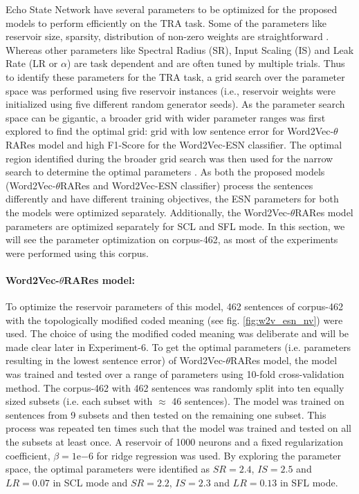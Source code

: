 Echo State Network have several parameters to be optimized for the proposed models to perform efficiently on the TRA task. Some of the parameters like reservoir size, sparsity, distribution of non-zero weights are straightforward \cite{esn:practical_guide}. Whereas other parameters like Spectral Radius (SR), Input Scaling (IS) and Leak Rate (LR or $\alpha$) are task dependent and are often tuned by multiple trials. Thus to identify these parameters for the TRA task, a grid search over the parameter space was performed using five reservoir instances (i.e., reservoir weights were initialized using five different random generator seeds). As the parameter search space can be gigantic, a broader grid with wider parameter ranges was first explored to find the optimal grid: grid with low sentence error for Word2Vec-$\theta$RARes model and high F1-Score for the Word2Vec-ESN classifier. The optimal region identified during the broader grid search was then used for the narrow search to determine the optimal parameters \cite{esn:practical_guide}. As both the proposed models (Word2Vec-$\theta$RARes and Word2Vec-ESN classifier) process the sentences differently and have different training objectives, the ESN parameters for both the models were optimized separately. Additionally, the Word2Vec-$\theta$RARes model parameters are optimized separately for SCL and SFL mode. In this section, we will see the parameter optimization on corpus-462, as most of the experiments were performed using this corpus. 

\paragraph{Word2Vec-$\theta$RARes model:} To optimize the reservoir parameters of this model, 462 sentences of corpus-462 with the topologically modified coded meaning (see fig. \ref{fig:w2v_esn_nv}) were used. The choice of using the modified coded meaning was deliberate and will be made clear later in Experiment-6. To get the optimal parameters (i.e. parameters resulting in the lowest sentence error) of Word2Vec-$\theta$RARes model, the model was trained and tested over a range of parameters using 10-fold cross-validation method. The corpus-462 with 462 sentences was randomly split into ten equally sized subsets (i.e. each subset with $\approx$ 46 sentences). The model was trained on sentences from 9 subsets and then tested on the remaining one subset. This process was repeated ten times such that the model was trained and tested on all the subsets at least once. A reservoir of 1000 neurons and a fixed regularization coefficient, $\beta = 1\mathrm{e}{-6}$ for ridge regression was used. By exploring the parameter space, the optimal parameters were identified as $SR = 2.4$, $IS = 2.5$ and $LR = 0.07$ in SCL mode and $SR = 2.2$, $IS = 2.3$ and $LR = 0.13$ in SFL mode. 

